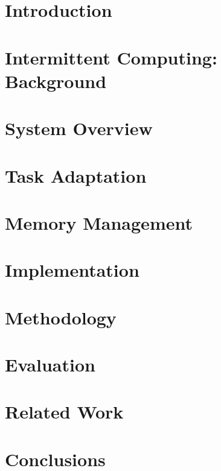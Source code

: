 \documentclass[format=acmsmall, review=false, screen=true]{acmart}
\begin{document}



\maketitle

\section{Introduction}
\label{sec:intro}



\section{Intermittent Computing: Background}
\label{sec:background}



\section{System Overview}
\label{sec:systemdescription}



\section{Task Adaptation}
\label{sec:task_adaptation}




\section{Memory Management}
\label{sec:memory_virtulaization}



\section{Implementation}
\label{sec:implementation}



\section{Methodology}
\label{sec:methodology}



\section{Evaluation}
\label{sec:evaluation}



\section{Related Work}
\label{sec:related_work}



\section{Conclusions}
\label{sec:conclusions}





\end{document}

